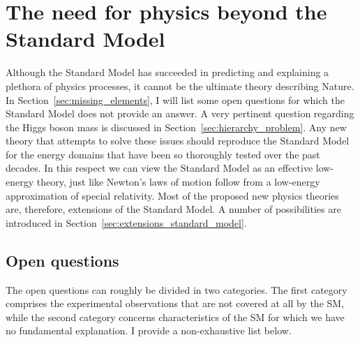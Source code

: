 \chapter{The need for physics beyond the Standard Model \label{chap:beyond_standard_model}}

Although the Standard Model has succeeded in predicting and explaining a plethora of physics
processes, it cannot be the ultimate theory describing Nature. In
Section~\ref{sec:missing_elements}, I will list some open questions for which the Standard Model
does not provide an answer. A very pertinent question regarding the Higgs boson mass is discussed
in Section~\ref{sec:hierarchy_problem}.
Any new theory that attempts to solve these issues should reproduce
the Standard Model for the energy domains that have been so thoroughly tested over the past
decades. In this respect we can view the Standard Model as an effective low-energy theory, just
like Newton's laws of motion follow from a low-energy approximation of special relativity. 
Most of the proposed new physics theories are, therefore, extensions of the Standard Model. 
A number of possibilities are introduced in Section~\ref{sec:extensions_standard_model}.

\section{Open questions \label{sec:missing_elements}}

The open questions can roughly be divided in two categories. The first category comprises the
experimental observations that are not covered at all by the SM, while the second category concerns
characteristics of the SM for which we have no fundamental explanation. 
I provide a non-exhaustive list below.

